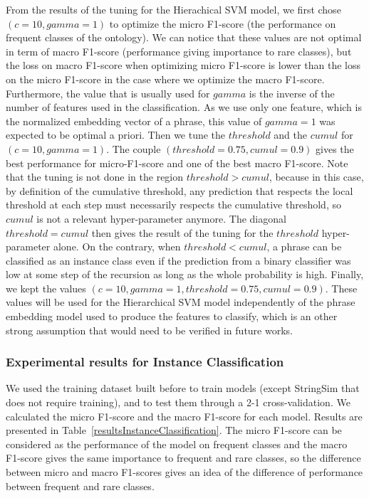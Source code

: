 \documentclass[12pt]{article}
\begin{document}
From the results of the tuning for the Hierachical SVM model, we first chose $(c=10, gamma=1)$ to optimize the micro F1-score (the performance on frequent classes of the ontology). We can notice that these values are not optimal in term of macro F1-score (performance giving importance to rare classes), but the loss on macro F1-score when optimizing micro F1-score is lower than the loss on the micro F1-score in the case where we optimize the macro F1-score. Furthermore, the value that is usually used for $gamma$ is the inverse of the number of features used in the classification. As we use only one feature, which is the normalized embedding vector of a phrase, this value of $gamma=1$ was expected to be optimal a priori.
Then we tune the $threshold$ and the $cumul$ for $(c=10, gamma=1)$. The couple $(threshold=0.75, cumul=0.9)$ gives the best performance for micro-F1-score and one of the best macro F1-score. Note that the tuning is not done in the region $threshold > cumul$, because in this case, by definition of the cumulative threshold, any prediction that respects the local threshold at each step must necessarily respects the cumulative threshold, so $cumul$ is not a relevant hyper-parameter anymore. The diagonal $threshold = cumul$ then gives the result of the tuning for the $threshold$ hyper-parameter alone. On the contrary, when $threshold < cumul$, a phrase can be classified as an instance class even if the prediction from a binary classifier was low at some step of the recursion as long as the whole probability is high. Finally, we kept the values $(c=10, gamma=1, threshold=0.75, cumul=0.9)$. These values will be used for the Hierarchical SVM model independently of the phrase embedding model used to produce the features to classify, which is an other strong assumption that would need to be verified in future works.\\

\subsubsection{Experimental results for Instance Classification}

We used the training dataset built before to train models (except StringSim that does not require training), and to test them through a 2-1 cross-validation.
We calculated the micro F1-score and the macro F1-score for each model. Results are presented in Table~\ref{resultsInstanceClassification}. The micro F1-score can be considered as the performance of the model on frequent classes and the macro F1-score gives the same importance to frequent and rare classes, so the difference between micro and macro F1-scores gives an idea of the difference of performance between frequent and rare classes.
\end{document}
